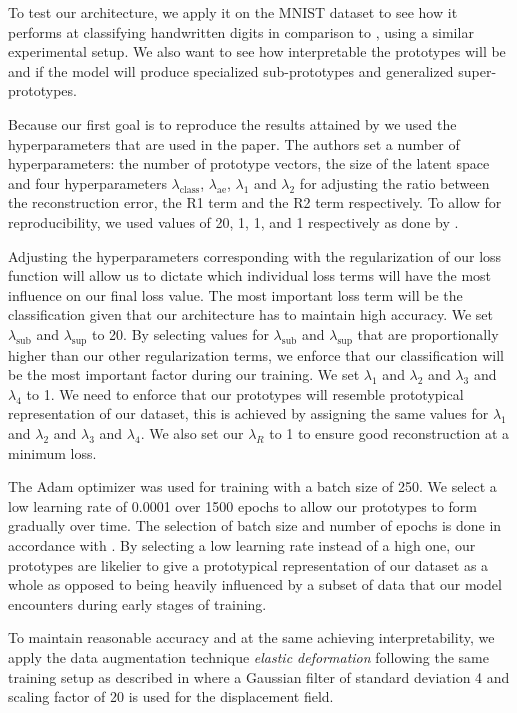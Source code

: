 To test our architecture, we apply it on the MNIST dataset to see how it performs at classifying handwritten digits in comparison to \cite{li2018deep}, using a similar experimental setup. We also want to see how interpretable the prototypes will be and if the model will produce specialized sub-prototypes and generalized super-prototypes.

Because our first goal is to reproduce the results attained by  \cite{li2018deep} we used the hyperparameters that are used in the paper. The authors set a number of hyperparameters: the number of prototype vectors, the size of the latent space and four hyperparameters $\lambda_{\text{class}}$, $\lambda_{\text{ae}}$, $\lambda_1$ and $\lambda_2$ for adjusting the ratio between the reconstruction error, the R1 term and the R2 term respectively. To allow for reproducibility, we used values of 20, 1, 1, and 1 respectively as done by \cite{li2018deep}.

Adjusting the hyperparameters corresponding with the regularization of our loss function will allow us to dictate which individual loss terms will have the most influence on our final loss value. The most important loss term will be the classification given that our architecture has to maintain high accuracy. We set $\lambda_{\text{sub}}$ and $\lambda_{\text{sup}}$ to 20. By selecting values for $\lambda_{\text{sub}}$ and $\lambda_{\text{sup}}$ that are proportionally higher than our other regularization terms, we enforce that our classification will be the most important factor during our training. We set $\lambda_{1}$ and $\lambda_{2}$ and $\lambda_{3}$ and $\lambda_{4}$ to 1. We need to enforce that our prototypes will resemble prototypical representation of our dataset, this is achieved by assigning the same values for $\lambda_{1}$ and $\lambda_{2}$ and $\lambda_{3}$ and $\lambda_{4}$. We also set our $\lambda_{R}$ to 1 to ensure good reconstruction at a minimum loss. 

The Adam optimizer \cite{adam} was used for training with a batch size of 250. We select a low learning rate of 0.0001 over 1500 epochs to allow our prototypes to form gradually over time. The selection of batch size and number of epochs is done in accordance with \cite{li2018deep}. By selecting a low learning rate instead of a high one, our prototypes are likelier to give a prototypical representation of our dataset as a whole as opposed to being heavily influenced by a subset of data that our model encounters during early stages of training. 


To maintain reasonable accuracy and at the same achieving interpretability, we apply the data augmentation technique \textit{elastic deformation}\citep{elasticdeformation} following the same training setup as described in \citep{li2018deep} where a Gaussian filter of standard deviation 4 and scaling factor of 20 is used for the displacement field. 